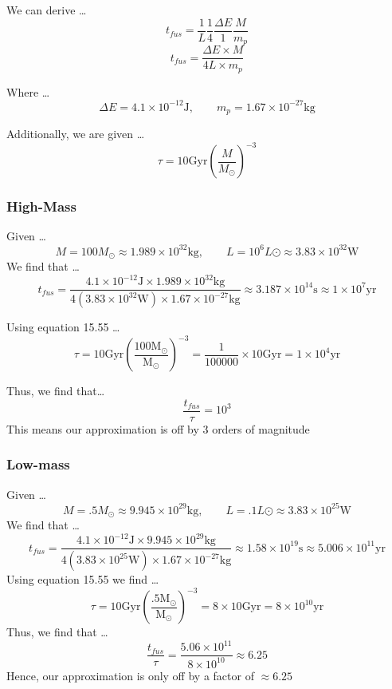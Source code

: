 \documentclass{article}
\begin{document}
We can derive \dots
    \[t_{fus} = \frac{1}{L} \frac{1}{4} \frac{\Delta E}{1} \frac{M}{m_p}\]
    \[t_{fus} = \frac{\Delta E \times M}{4L\times m_p}\]

Where \dots
    \[\Delta E = 4.1 \times 10^{-12} \text{J}, \qquad m_p = 1.67 \times 10^{-27} \text{kg}\]

Additionally, we are given \dots
\begin{equation}
    \tau = 10 \text{Gyr}\left(\frac{M}{M_\odot}\right)^{-3}
    \tag{15.55}
\end{equation}

\subsubsection{High-Mass}
Given \dots
    \[M = 100 M_\odot \approx 1.989 \times 10^{32} \text{kg}, \qquad  L = 10^6 L\odot \approx 3.83 \times 10^{32} \text{W}\]
We find that \dots
    \[t_{fus} = \frac{4.1 \times 10^{-12} \text{J} \times 1.989 \times 10^{32} \text{kg}}{4(3.83 \times 10^{32} \text{W})\times 1.67 \times 10^{-27} \text{kg}} \boxed{\approx 3.187 \times 10^{14} \text{s} \approx 1 \times 10^7 \text{yr}}\]

Using equation 15.55 \dots
    \[\tau = 10 \text{Gyr}\left(\frac{\text{100}\text{M}_\odot}{\text{M}_\odot}\right)^{-3} = \frac{1}{100000} \times 10\text{Gyr} = 1  \times 10^4\text{yr} \]

Thus, we find that\dots
    \[\frac{t_{fus}}{\tau} = 10^3\]
This means our approximation is off by 3 orders of magnitude 

\subsubsection{Low-mass}
Given \dots
    \[M = .5 M_\odot \approx 9.945 \times 10^{29} \text{kg}, \qquad  L = .1 L\odot \approx 3.83 \times 10^{25} \text{W}\]
We find that \dots
    \[t_{fus} = \frac{4.1 \times 10^{-12} \text{J} \times 9.945 \times 10^{29} \text{kg}}{4(3.83 \times 10^{25} \text{W})\times 1.67 \times 10^{-27} \text{kg}} \approx \boxed{1.58 \times 10^{19} \text{s} \approx 5.006 \times 10^{11} \text{yr}}\]
Using equation 15.55 we find \dots
    \[\tau = 10\text{Gyr}\left(\frac{.5\text{M}_\odot}{\text{M}_\odot}\right)^{-3} = 8 \times 10 \text{Gyr} = \boxed{8\times 10^{10}\text{yr}}\]
Thus, we find that \dots
    \[\frac{t_{fus}}{\tau} = \frac{5.06 \times 10^{11}}{8 \times 10^{10}} \approx 6.25\]
Hence, our approximation is only off by a factor of \(\approx 6.25\) 
    
\end{document}
